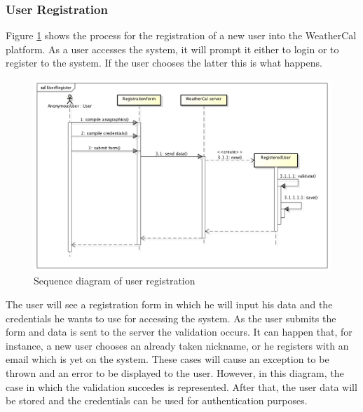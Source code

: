 \subsubsection{User Registration}
Figure \ref{fig:regseqdiag} shows the process for the registration of a new user into the WeatherCal platform. As a user accesses the system, it will prompt it either to login or to register to the system. If the user chooses the latter this is what happens.
\begin{center}
 \begin{figure}[H]
    \includegraphics[width=1\textwidth]{../UMLDiagram/sequence/UserRegister/UserRegister.png}
    \caption{Sequence diagram of user registration}
     \label{fig:regseqdiag}
     \end{figure}
   \end{center}  
The user will see a registration form in which he will input his data and the credentials he wants to use for accessing the system. As the user submits the form and data is sent to the server the validation occurs. It can happen that, for instance, a new user chooses an already taken nickname, or he registers with an email which is yet on the system. These cases will cause an exception to be thrown and an error to be displayed to the user. However, in this diagram, the case in which the validation succedes is represented. After that, the user data will be stored and the credentials can be used for authentication purposes.
\newpage
